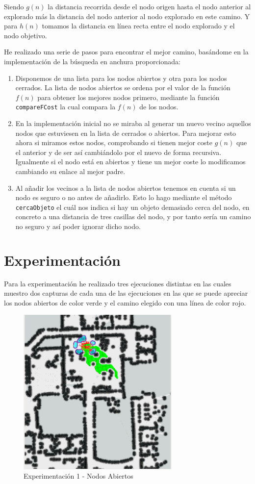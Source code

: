 \documentclass[12pt]{article}
\begin{document}
Siendo $g(n)$ la distancia recorrida desde el nodo origen hasta el nodo anterior al explorado más la distancia del nodo anterior al nodo explorado en este camino. Y para $h(n)$ tomamos la distancia en línea recta entre el nodo explorado y el nodo objetivo.


He realizado una serie de pasos para encontrar el mejor camino, basándome en la implementación de la búsqueda en anchura proporcionada:
\begin{enumerate}
\item Disponemos de una lista para los nodos abiertos y otra para los nodos cerrados. La lista de nodos abiertos se ordena por el valor de la función $f(n)$ para obtener los mejores nodos primero, mediante la función \texttt{compareFCost} la cual compara la $f(n)$ de los nodos.
\item En la implementación inicial no se miraba al generar un nuevo vecino aquellos nodos que estuviesen en la lista de cerrados o abiertos. Para mejorar esto ahora si miramos estos nodos, comprobando si tienen mejor coste $g(n)$ que el anterior y de ser así cambiándolo por el nuevo de forma recursiva. Igualmente si el nodo está en abiertos y tiene un mejor coste lo modificamos cambiando su enlace al mejor padre.
\item Al añadir los vecinos a la lista de nodos abiertos tenemos en cuenta si un nodo es seguro o no antes de añadirlo. Esto lo hago mediante el método \texttt{cercaObjeto} el cuál nos indica si hay un objeto demasiado cerca del nodo, en concreto a una distancia de tres casillas del nodo, y por tanto sería un camino no seguro y así poder ignorar dicho nodo.
\end{enumerate}



\section{Experimentación}
Para la experimentación he realizado tres ejecuciones distintas en las cuales muestro dos capturas de cada una de las ejecuciones en las que se puede apreciar los nodos abiertos de color verde y el camino elegido con una línea de color rojo.

\begin{figure}[H] 
	\centering
	\includegraphics[width=8cm]{img/exp_1_1.png}
	\caption{Experimentación 1 - Nodos Abiertos}
\end{figure}
\end{document}
